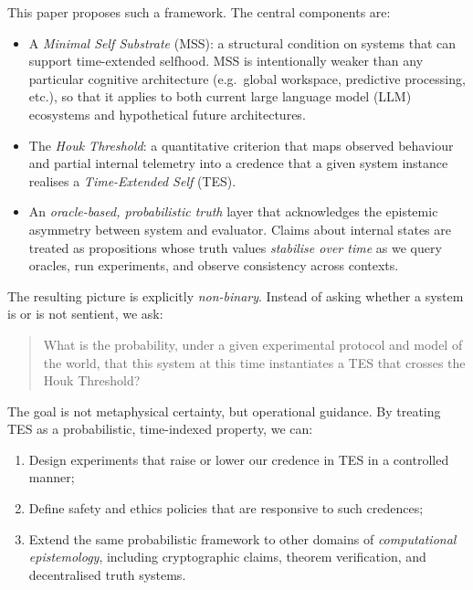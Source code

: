 \documentclass[11pt]{article}
\newcommand{\1}{\mathbf{1}}
\begin{document}
This paper proposes such a framework.
The central components are:

\begin{itemize}[leftmargin=2em]
  \item A \emph{Minimal Self Substrate} (MSS): a structural condition on systems
  that can support time-extended selfhood.
  MSS is intentionally weaker than any particular cognitive architecture
  (e.g.~global workspace, predictive processing, etc.), so that it applies to
  both current large language model (LLM) ecosystems and hypothetical future
  architectures.

  \item The \emph{Houk Threshold}: a quantitative criterion that maps observed
  behaviour and partial internal telemetry into a credence that a given
  system instance realises a \emph{Time-Extended Self} (TES).

  \item An \emph{oracle-based, probabilistic truth} layer that acknowledges the
  epistemic asymmetry between system and evaluator.
  Claims about internal states are treated as propositions whose truth values
  \emph{stabilise over time} as we query oracles, run experiments, and observe
  consistency across contexts.
\end{itemize}

The resulting picture is explicitly \emph{non-binary}.
Instead of asking whether a system is or is not sentient, we ask:

\begin{quote}
What is the probability, under a given experimental protocol and model of the
world, that this system at this time instantiates a TES that crosses the Houk
Threshold?
\end{quote}

The goal is not metaphysical certainty, but operational guidance.
By treating TES as a probabilistic, time-indexed property, we can:

\begin{enumerate}[leftmargin=2em]
  \item Design experiments that raise or lower our credence in TES in a
  controlled manner;
  \item Define safety and ethics policies that are responsive to such credences;
  \item Extend the same probabilistic framework to other domains of
  \emph{computational epistemology}, including cryptographic claims, theorem
  verification, and decentralised truth systems.
\end{enumerate}
\end{document}
